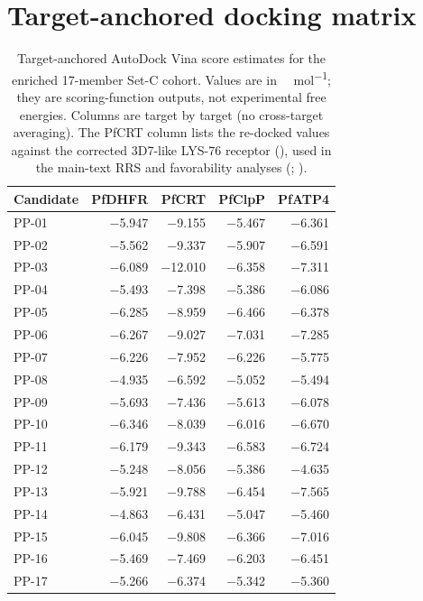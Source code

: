 \documentclass[journal=jcisd8,manuscript=suppinfo]{achemso}
\begin{document}
\section{Target-anchored docking matrix}\label{sec:sm_vina_matrix}
\begin{table}[ht!]
\centering
\caption{Target-anchored AutoDock Vina score estimates for the enriched 17-member Set-C cohort. Values are in \si{\kilo\calorie\per\mole}; they are scoring-function outputs, not experimental free energies. Columns are target by target (no cross-target averaging). The PfCRT column lists the re-docked values against the corrected 3D7-like LYS-76 receptor (), used in the main-text RRS and favorability analyses (; ).}
\label{tab:vina}
\small
\begin{tabular}{@{}lrrrr@{}}
\toprule
Candidate & PfDHFR & PfCRT & PfClpP & PfATP4 \\
\midrule
PP-01 & \num{-5.947} & \num{-9.155} & \num{-5.467} & \num{-6.361} \\
PP-02 & \num{-5.562} & \num{-9.337} & \num{-5.907} & \num{-6.591} \\
PP-03 & \num{-6.089} & \num{-12.010} & \num{-6.358} & \num{-7.311} \\
PP-04 & \num{-5.493} & \num{-7.398} & \num{-5.386} & \num{-6.086} \\
PP-05 & \num{-6.285} & \num{-8.959} & \num{-6.466} & \num{-6.378} \\
PP-06 & \num{-6.267} & \num{-9.027} & \num{-7.031} & \num{-7.285} \\
PP-07 & \num{-6.226} & \num{-7.952} & \num{-6.226} & \num{-5.775} \\
PP-08 & \num{-4.935} & \num{-6.592} & \num{-5.052} & \num{-5.494} \\
PP-09 & \num{-5.693} & \num{-7.436} & \num{-5.613} & \num{-6.078} \\
PP-10 & \num{-6.346} & \num{-8.039} & \num{-6.016} & \num{-6.670} \\
PP-11 & \num{-6.179} & \num{-9.343} & \num{-6.583} & \num{-6.724} \\
PP-12 & \num{-5.248} & \num{-8.056} & \num{-5.386} & \num{-4.635} \\
PP-13 & \num{-5.921} & \num{-9.788} & \num{-6.454} & \num{-7.565} \\
PP-14 & \num{-4.863} & \num{-6.431} & \num{-5.047} & \num{-5.460} \\
PP-15 & \num{-6.045} & \num{-9.808} & \num{-6.366} & \num{-7.016} \\
PP-16 & \num{-5.469} & \num{-7.469} & \num{-6.203} & \num{-6.451} \\
PP-17 & \num{-5.266} & \num{-6.374} & \num{-5.342} & \num{-5.360} \\
\bottomrule
\end{tabular}
\end{table}
\end{document}
